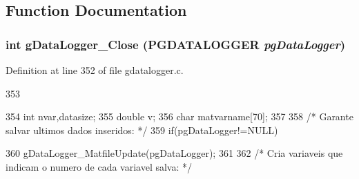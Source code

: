 \subsection{Function Documentation}
\subsubsection[{gDataLogger\_\-Close}]{\setlength{\rightskip}{0pt plus 5cm}int gDataLogger\_\-Close ({\bf PGDATALOGGER} {\em pgDataLogger})}\label{gdatalogger_8h_a0ac95f84c6ee484c4ad0351530f1c468}


Definition at line 352 of file gdatalogger.c.


\begin{DoxyCode}
353 {
354         int nvar,datasize;
355         double v;
356         char matvarname[70];
357 
358         /* Garante salvar ultimos dados inseridos: */
359         if(pgDataLogger!=NULL){
360                 gDataLogger_MatfileUpdate(pgDataLogger);
361 
362                 /* Cria variaveis que indicam o numero de cada variavel salva: */
      
}}
\end{DoxyCode}
